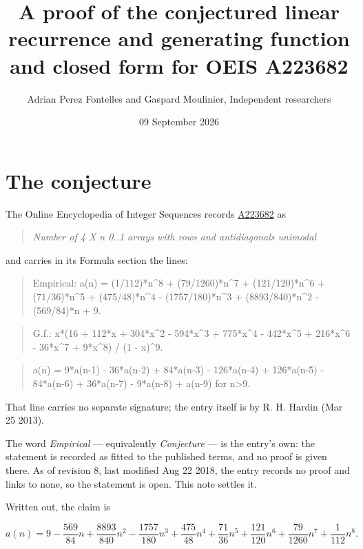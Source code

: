 \documentclass[11pt]{article}
\title{A proof of the conjectured linear recurrence and generating function and closed form for OEIS A223682}
\author{Adrian Perez Fontelles and Gaspard Moulinier, Independent researchers}
\date{09 September 2026}
\theoremstyle{definition}
\begin{document}
\maketitle
\section{The conjecture}

The Online Encyclopedia of Integer Sequences records \href{https://oeis.org/A223682}{A223682} as

\begin{quote}\itshape Number of 4 X n 0..1 arrays with rows and antidiagonals unimodal\end{quote}

and carries in its Formula section the lines:

\begin{quote}\ttfamily Empirical: a(n) = (1/112)*n\textasciicircum{}8 + (79/1260)*n\textasciicircum{}7 + (121/120)*n\textasciicircum{}6 + (71/36)*n\textasciicircum{}5 + (475/48)*n\textasciicircum{}4 - (1757/180)*n\textasciicircum{}3 + (8893/840)*n\textasciicircum{}2 - (569/84)*n + 9.\end{quote}

\begin{quote}\ttfamily G.f.: x*(16 + 112*x + 304*x\textasciicircum{}2 - 594*x\textasciicircum{}3 + 775*x\textasciicircum{}4 - 442*x\textasciicircum{}5 + 216*x\textasciicircum{}6 - 36*x\textasciicircum{}7 + 9*x\textasciicircum{}8) / (1 - x)\textasciicircum{}9.\end{quote}

\begin{quote}\ttfamily a(n) = 9*a(n-1) - 36*a(n-2) + 84*a(n-3) - 126*a(n-4) + 126*a(n-5) - 84*a(n-6) + 36*a(n-7) - 9*a(n-8) + a(n-9) for n>9.\end{quote}

That line carries no separate signature; the entry itself is by R. H. Hardin (Mar 25 2013).

The word {\itshape Empirical} --- equivalently {\itshape Conjecture} --- is the entry's own: the statement is recorded as fitted to the published terms, and no proof is given there. As of revision 8, last modified Aug 22 2018, the entry records no proof and links to none, so the statement is open. This note settles it.

Written out, the claim is

\[a(n) = 9 - \frac{569}{84}n + \frac{8893}{840}n^{2} - \frac{1757}{180}n^{3} + \frac{475}{48}n^{4} + \frac{71}{36}n^{5} + \frac{121}{120}n^{6} + \frac{79}{1260}n^{7} + \frac{1}{112}n^{8}.\]
\end{document}
